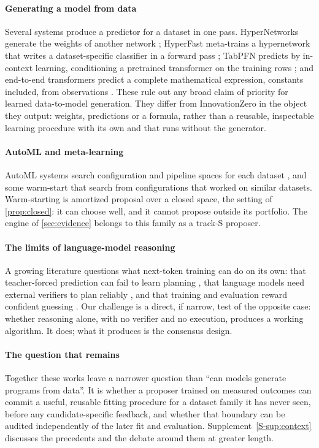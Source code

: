 \paragraph{Generating a model from data} Several systems produce a predictor for a dataset in one
pass. HyperNetworks generate the weights of another network \citep{ha2017hypernetworks}; HyperFast
meta-trains a hypernetwork that writes a dataset-specific classifier in a forward pass
\citep{bonet2024hyperfast}; TabPFN predicts by in-context learning, conditioning a pretrained
transformer on the training rows \citep{hollmann2025tabpfn}; and end-to-end transformers predict a
complete mathematical expression, constants included, from observations \citep{kamienny2022e2e}.
These rule out any broad claim of priority for learned data-to-model generation. They differ from
InnovationZero in the object they output: weights, predictions or a formula, rather than a reusable,
inspectable learning procedure with its own  and  that runs without the
generator.

\paragraph{AutoML and meta-learning} AutoML systems search configuration and pipeline spaces for each
dataset \citep{feurer2015autosklearn,olson2016tpot,wang2021flaml}, and some warm-start that search
from configurations that worked on similar datasets. Warm-starting is amortized proposal over a
closed space, the setting of \cref{prop:closed}: it can choose well, and it cannot propose outside
its portfolio. The engine of \cref{sec:evidence} belongs to this family as a track-S proposer.

\paragraph{The limits of language-model reasoning} A growing literature questions what next-token
training can do on its own: that teacher-forced prediction can fail to learn planning
\citep{bachmann2024pitfalls}, that language models need external verifiers to plan reliably
\citep{kambhampati2024modulo}, and that training and evaluation reward confident guessing
\citep{kalai2025hallucinate}. Our challenge is a direct, if narrow, test of the opposite case:
whether reasoning alone, with no verifier and no execution, produces a working algorithm. It does;
what it produces is the consensus design.

\paragraph{The question that remains} Together these works leave a narrower question than ``can
models generate programs from data''. It is whether a proposer trained on measured outcomes can
commit a useful, reusable fitting procedure for a dataset family it has never seen, before any
candidate-specific feedback, and whether that boundary can be audited independently of the later
fit and evaluation. Supplement~\ref{S-sup:context} discusses the precedents and the debate around
them at greater length.
